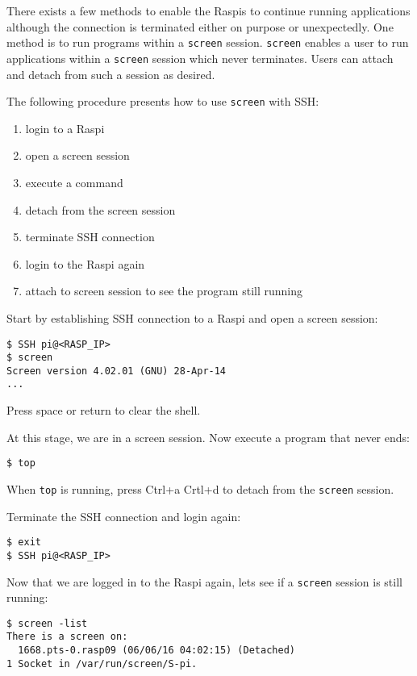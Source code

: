 There exists a few methods to enable the \ac{Raspi}s to continue running
applications although the connection is terminated either on purpose or
unexpectedly.
One method is to run programs within a \texttt{screen} session.
\texttt{screen} enables a user to run applications within a \texttt{screen}
session which never terminates. Users can attach and detach from such a
session as desired.

The following procedure presents how to use \texttt{screen} with \ac{SSH}:
\begin{enumerate}
    \item login to a \ac{Raspi}
    \item open a screen session
    \item execute a command
    \item detach from the screen session
    \item terminate SSH connection
    \item login to the \ac{Raspi} again
    \item attach to screen session to see the program still running
\end{enumerate}

Start by establishing SSH connection to a \ac{Raspi} and open a screen session:
\begin{lstlisting}[]
$ SSH pi@<RASP_IP>
$ screen
Screen version 4.02.01 (GNU) 28-Apr-14
...
\end{lstlisting}
\FloatBarrier
\vspace{-5mm}
Press space or return to clear the shell.

At this stage, we are in a screen session. Now execute a program that never ends:
\begin{lstlisting}[]
$ top
\end{lstlisting}
\FloatBarrier
\vspace{-5mm}

When \texttt{top} is running, press Ctrl+a Crtl+d to detach from
the \texttt{screen} session.

Terminate the SSH connection and login again:
\begin{lstlisting}[]
$ exit
$ SSH pi@<RASP_IP>
\end{lstlisting}
\FloatBarrier
\vspace{-5mm}

Now that we are logged in to the \ac{Raspi} again, lets see if a
\texttt{screen} session is still running:
\begin{lstlisting}[]
$ screen -list
There is a screen on:
  1668.pts-0.rasp09 (06/06/16 04:02:15) (Detached)
1 Socket in /var/run/screen/S-pi.
\end{lstlisting}
\FloatBarrier
\vspace{-5mm}

